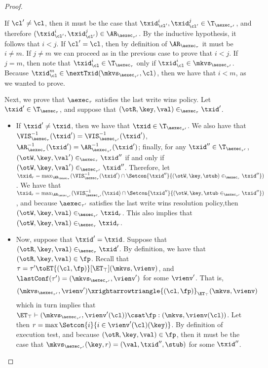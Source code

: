 \begin{proof}
\begin{itemize}
\begin{itemize}
If $\cl' \neq \cl$, then it must be the case that $\txid_{\cl'}^{i}, \txid_{\cl'}^{j} \in \T_{\aexec_{\tau'}}$, 
and therefore $(\txid_{\cl'}^{i}, \txid_{\cl'}^{j}) \in \AR_{\aexec_{\tau'}}$. By the inductive hypothesis, 
it follows that $i < j$. If $\cl' = \cl$, then by definition of $\AR_{\aexec_{\tau}}$ it must be  $i \neq m$. 
If $j \neq m$ we can proceed as in the previous case to prove that $i < j$. If $j = m$, then 
note that $\txid_{\cl}^{i} \in \T_{\aexec_{\tau}}$ only if $\txid_{\cl}^{i} \in \mkvs_{\aexec_{\tau'}}$. 
Because $\txid_{\cl}^{m} \in \nextTxid(\mkvs_{\aexec_{\tau'}}, \cl)$, then we have that $i < m$, 
as we wanted to prove.
\end{itemize}

Next, we prove that $\aexec_{\tau}$ satisfies the last write wins policy. 
Let $\txid' \in \T_{\aexec_{\tau}}$, and suppose that $(\otR, \key, \val) \in_{\aexec_{\tau}} \txid'$. 
\begin{itemize} 
\item If $\txid' \neq \txid$, then we have that $\txid \in \T_{\aexec_{\tau'}}$. We also have that 
$\VIS^{-1}_{\aexec_{\tau}}(\txid') = \VIS^{-1}_{\aexec_{\tau'}}(\txid')$, $\AR^{-1}_{\aexec_{\tau}}(\txid') 
= \AR^{-1}_{\aexec_{\tau'}}(\txid')$; finally, for any $\txid'' \in \T_{\aexec_{\tau'}}$, 
$(\otW, \key, \val') \in_{\aexec_{\tau}} \txid''$ if and only if $(\otW, \key, \val') \in_{\aexec_{\tau'}} 
\txid''$. Therefore, let $\txid_{r} = \max_{\AR_{\aexec_{\tau}}}(\VIS^{-1}_{\aexec_{\tau}}(\txid') \cap 
\Setcon{\txid'' }{ (\otW, \key, \stub) \in_{\aexec_{\tau}} \txid''})$. We have that $\txid_{r} = \max_{\AR_{\aexec_{\tau'}}}(\VIS^{-1}_{\aexec_{\tau'}}(\txid) 
\cap \Setcon{ \txid'' }{ (\otW, \key, \stub \in_{\aexec_{\tau'}} \txid''})$, and because $\aexec_{\tau'}$ satisfies the last write 
wins resolution policy,then $(\otW, \key, \val) \in_{\aexec_{\tau'}} \txid_{r}$. This also implies that 
$(\otW, \key, \val) \in_{\aexec_{\tau}} \txid_{r}$. 

\item Now, suppose that $\txid' = \txid$. Suppose that $(\otR, \key, \val) \in_{\aexec_{\tau}} \txid'$. 
By definition, we have that $(\otR, \key, \val) \in \fp$. Recall that $\tau = \tau' \toET{(\cl, \fp)}[\ET_{\top}] (\mkvs, \vienv)$, 
and $\lastConf(\tau') = (\mkvs_{\aexec_{\tau'}}, \vienv')$ for some $\vienv'$. 
That is, 
\[
    (\mkvs_{\aexec_{\tau'}}, \vienv') \xrightarrowtriangle{(\cl, \fp)}_{\ET_{\top}} (\mkvs, \vienv)
\]
which in turn implies that $\ET_{\top} \vdash (\mkvs_{\aexec_{\tau'}}, \vienv'(\cl)) \csat \fp : (\mkvs,\vienv(\cl) )$. 
Let then $r = \max\Setcon{i}{  i \in \vienv'(\cl)(\key)}$. 
By definition of execution test, and because $(\otR, \key, \val) \in \fp$, then it must be the case that 
$\mkvs_{\aexec_{\tau'}}(\key, r) = (\val, \txid'', \stub)$ for some $\txid''$. 


\end{itemize}
\end{itemize}
\end{proof}
